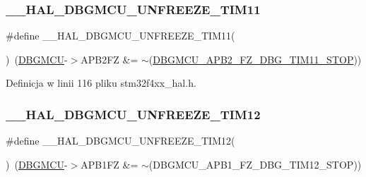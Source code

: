 \subsubsection{\texorpdfstring{\+\_\+\+\_\+\+H\+A\+L\+\_\+\+D\+B\+G\+M\+C\+U\+\_\+\+U\+N\+F\+R\+E\+E\+Z\+E\+\_\+\+T\+I\+M11}{\_\_HAL\_DBGMCU\_UNFREEZE\_TIM11}}
{\footnotesize\ttfamily \#define \+\_\+\+\_\+\+H\+A\+L\+\_\+\+D\+B\+G\+M\+C\+U\+\_\+\+U\+N\+F\+R\+E\+E\+Z\+E\+\_\+\+T\+I\+M11(\begin{DoxyParamCaption}{ }\end{DoxyParamCaption})~(\hyperlink{group___peripheral__declaration_ga92ec6d9ec2251fda7d4ce09748cd74b4}{D\+B\+G\+M\+CU}-\/$>$A\+P\+B2\+FZ \&= $\sim$(\hyperlink{group___peripheral___registers___bits___definition_ga354671c942db40e69820fd783ef955b4}{D\+B\+G\+M\+C\+U\+\_\+\+A\+P\+B2\+\_\+\+F\+Z\+\_\+\+D\+B\+G\+\_\+\+T\+I\+M11\+\_\+\+S\+T\+OP}))}



Definicja w linii 116 pliku stm32f4xx\+\_\+hal.\+h.

\mbox{\label{group___h_a_l___exported___macros_gaa8e882be8db24537679bc0d4a129f448}} 
\subsubsection{\texorpdfstring{\+\_\+\+\_\+\+H\+A\+L\+\_\+\+D\+B\+G\+M\+C\+U\+\_\+\+U\+N\+F\+R\+E\+E\+Z\+E\+\_\+\+T\+I\+M12}{\_\_HAL\_DBGMCU\_UNFREEZE\_TIM12}}
{\footnotesize\ttfamily \#define \+\_\+\+\_\+\+H\+A\+L\+\_\+\+D\+B\+G\+M\+C\+U\+\_\+\+U\+N\+F\+R\+E\+E\+Z\+E\+\_\+\+T\+I\+M12(\begin{DoxyParamCaption}{ }\end{DoxyParamCaption})~(\hyperlink{group___peripheral__declaration_ga92ec6d9ec2251fda7d4ce09748cd74b4}{D\+B\+G\+M\+CU}-\/$>$A\+P\+B1\+FZ \&= $\sim$(D\+B\+G\+M\+C\+U\+\_\+\+A\+P\+B1\+\_\+\+F\+Z\+\_\+\+D\+B\+G\+\_\+\+T\+I\+M12\+\_\+\+S\+T\+OP))}



